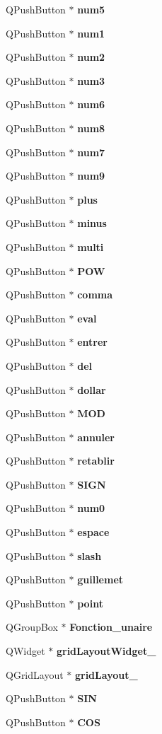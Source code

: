 \begin{DoxyCompactItemize}
\item 
Q\-Push\-Button $\ast$ {\bf num5}
\item 
Q\-Push\-Button $\ast$ {\bf num1}
\item 
Q\-Push\-Button $\ast$ {\bf num2}
\item 
Q\-Push\-Button $\ast$ {\bf num3}
\item 
Q\-Push\-Button $\ast$ {\bf num6}
\item 
Q\-Push\-Button $\ast$ {\bf num8}
\item 
Q\-Push\-Button $\ast$ {\bf num7}
\item 
Q\-Push\-Button $\ast$ {\bf num9}
\item 
Q\-Push\-Button $\ast$ {\bf plus}
\item 
Q\-Push\-Button $\ast$ {\bf minus}
\item 
Q\-Push\-Button $\ast$ {\bf multi}
\item 
Q\-Push\-Button $\ast$ {\bf P\-O\-W}
\item 
Q\-Push\-Button $\ast$ {\bf comma}
\item 
Q\-Push\-Button $\ast$ {\bf eval}
\item 
Q\-Push\-Button $\ast$ {\bf entrer}
\item 
Q\-Push\-Button $\ast$ {\bf del}
\item 
Q\-Push\-Button $\ast$ {\bf dollar}
\item 
Q\-Push\-Button $\ast$ {\bf M\-O\-D}
\item 
Q\-Push\-Button $\ast$ {\bf annuler}
\item 
Q\-Push\-Button $\ast$ {\bf retablir}
\item 
Q\-Push\-Button $\ast$ {\bf S\-I\-G\-N}
\item 
Q\-Push\-Button $\ast$ {\bf num0}
\item 
Q\-Push\-Button $\ast$ {\bf espace}
\item 
Q\-Push\-Button $\ast$ {\bf slash}
\item 
Q\-Push\-Button $\ast$ {\bf guillemet}
\item 
Q\-Push\-Button $\ast$ {\bf point}
\item 
Q\-Group\-Box $\ast$ {\bf Fonction\-\_\-unaire}
\item 
Q\-Widget $\ast$ {\bf grid\-Layout\-Widget\-\_}
\item 
Q\-Grid\-Layout $\ast$ {\bf grid\-Layout\-\_}
\item 
Q\-Push\-Button $\ast$ {\bf S\-I\-N}
\item 
Q\-Push\-Button $\ast$ {\bf C\-O\-S}
\item 

\end{DoxyCompactItemize}
